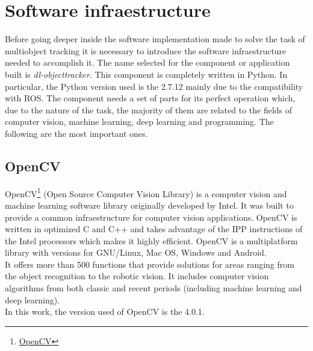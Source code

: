 \chapter{Software infraestructure}

Before going deeper inside the software implementation made to solve the task of multiobject tracking it is necessary to introduce the software infraestructure needed to accomplish it. The name selected for the component or application built is \textit{dl-objecttracker}. This component is completely written in Python. In particular, the Python version used is the 2.7.12 mainly due to the compatibility with ROS. The component needs a set of parts for its perfect operation which, due to the nature of the task, the majority of them are related to the fields of computer vision, machine learning, deep learning and programming. The following are the most important ones.

\section{OpenCV}
OpenCV\footnote {\href{https://opencv.org/}{OpenCV}} (Open Source Computer Vision Library) is a computer vision and machine learning software library originally developed by Intel. It was built to provide a common infraestructure for computer vision applications. OpenCV is written in optimized C and C++ and takes advantage of the IPP instructions of the Intel processors which makes it highly efficient. OpenCV is a multiplatform library with versions for GNU/Linux, Mac OS, Windows and Android.\\ It offers more than 500 functions that provide solutions for areas ranging from the object recognition to the robotic vision. It includes computer vision algorithms from both classic and recent periods (including machine learning and deep learning).\\
In this work, the version used of OpenCV is the 4.0.1.

